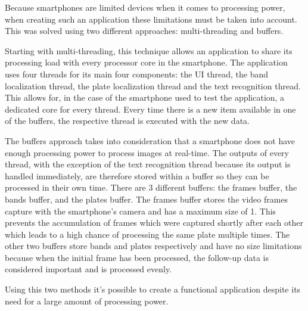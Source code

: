 Because smartphones are limited devices when it comes to processing power, when creating such an application these limitations must be taken into account. This was solved using two different approaches: multi-threading and buffers.

Starting with multi-threading, this technique allows an application to share its processing load with every processor core in the smartphone. The application uses four threads for its main four components: the UI thread, the band localization thread, the plate localization thread and the text recognition thread. This allows for, in the case of the smartphone used to test the application, a dedicated core for every thread. Every time there is a new item available in one of the buffers, the respective thread is executed with the new data.

The buffers approach takes into consideration that a smartphone does not have enough processing power to process images at real-time. The outputs of every thread, with the exception of the text recognition thread because its output is handled immediately, are therefore stored within a buffer so they can be processed in their own time. There are 3 different buffers: the frames buffer, the bands buffer, and the plates buffer. 
The frames buffer stores the video frames capture with the smartphone's camera and has a maximum size of 1. This prevents the accumulation of frames which were captured shortly after each other which leads to a high chance of processing the same plate multiple times. The other two buffers store bands and plates respectively and have no size limitations because when the initial frame has been processed, the follow-up data is considered important and is processed evenly.

Using this two methods it's possible to create a functional application despite its need for a large amount of processing power.



